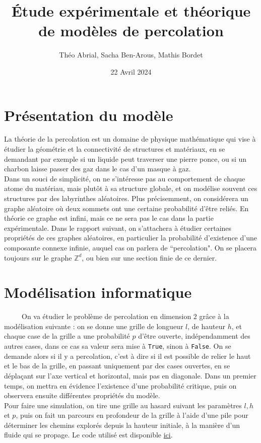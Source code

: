 \documentclass[11pt,a4paper]{article}
\title{\textbf{Étude expérimentale et théorique de modèles de percolation}}
\date{22 Avril 2024}
\author{Théo Abrial, Sacha Ben-Arous, Mathis Bordet}
\begin{document}
\maketitle 
\tableofcontents
\newpage
\section{Présentation du modèle}

La théorie de la percolation est un domaine de physique mathématique qui vise à étudier la géométrie et la connectivité de structures et matériaux, en se demandant par exemple si un liquide peut traverser une pierre ponce, ou si un charbon laisse passer des gaz dans le cas d'un masque à gaz. \\
Dans un souci de simplicité, on ne s'intéresse pas au comportement de chaque atome du matériau, mais plutôt à sa structure globale, et on modélise souvent ces structures par des labyrinthes aléatoires. 
Plus précisemment, on considérera un graphe aléatoire où deux sommets ont une certaine probabilité d'être reliés. En théorie ce graphe est infini, mais ce ne sera pas le cas dans la partie expérimentale. Dans le rapport suivant, on s'attachera à étudier certaines propriétés de ces graphes aléatoires, en particulier la probabilité d'existence d'une composante connexe infinie, auquel cas on parlera de ``percolation". On se placera toujours sur le graphe $\mathbb{Z}^d$, ou bien sur une section finie de ce dernier. 

\section{Modélisation informatique}
\ \ \ \ \ On va étudier le problème de percolation en dimension $2$ grâce à la modélisation suivante : on se donne une grille de longueur $l$, de hauteur $h$, et chaque case de la grille a une probabilité $p$ d'être ouverte, indépendamment des autres cases, dans ce cas sa valeur sera mise à \verb|True|, sinon à \verb|False|. On se demande alors si il y a percolation, c'est à dire si il est possible de relier le haut et le bas de la grille, en passant uniquement par des cases ouvertes, en se déplaçant sur l'axe vertical et horizontal, mais pas en diagonale. Dans un premier temps, on mettra en évidence l'existence d'une probabilité critique, puis on observera ensuite différentes propriétés du modèle. \\
Pour faire une simulation, on tire une grille au hasard suivant les paramètres $l,h$ et $p$, puis on fait un parcours en profondeur de la grille à l'aide d'une pile pour déterminer les chemins explorés depuis la hauteur initiale, à la manière d'un fluide qui se propage. Le code utilisé est disponible \href{https://github.com/Hazdard/Percolation/blob/main/percolation.ipynb}{ici}.
\end{document}
